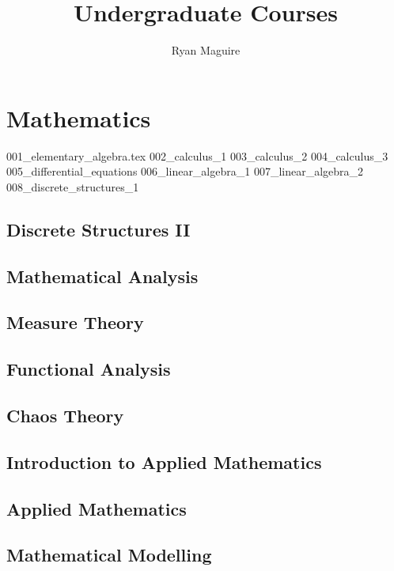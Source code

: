 \documentclass[crop=false,class=book,oneside]{standalone}
\begin{document}
    \newif\ifmain
    \ifstandalone
        \title{Undergraduate Courses}
        \author{Ryan Maguire}
        \date{\vspace{-5ex}}
        \maketitle
        \tableofcontents
        \listoffigures
        \listoftables
        \clearpage
    \fi
    \part{Mathematics}
        {001_elementary_algebra.tex}
        {002_calculus_1}
        {003_calculus_2}
        {004_calculus_3}
        {005_differential_equations}
        {006_linear_algebra_1}
        {007_linear_algebra_2}
        {008_discrete_structures_1}
        \chapter{Discrete Structures II}
        \chapter{Mathematical Analysis}
        \chapter{Measure Theory}
        \chapter{Functional Analysis}
        \chapter{Chaos Theory}
        \chapter{Introduction to Applied Mathematics}
        \chapter{Applied Mathematics}
        \chapter{Mathematical Modelling}
\end{document}

